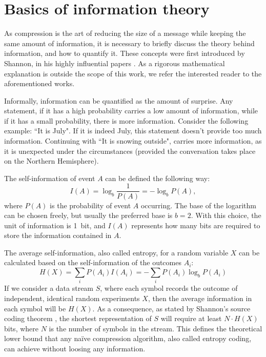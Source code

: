   
    \section{Basics of information theory}
      \label{sec:entropy}
      As compression is the art of reducing the size of a message while keeping the same amount of information, it is necessary to briefly discuss the theory behind information, and how to quantify it. These concepts were first introduced by Shannon, in his highly influential papers \cite{shannon_mathematical_1948,shannon_mathematical_1948-1,shannon_prediction_1951}. As a rigorous mathematical explanation is outside the scope of this work, we refer the interested reader to the aforementioned works.
  
      Informally, information can be quantified as the amount of surprise. Any statement, if it has a high probability carries a low amount of information, while if it has a small probability, there is more information. Consider the following example: ``It is July". If it is indeed July, this statement doesn't provide too much information. Continuing with ``It is snowing outside", carries more information, as it is unexpected under the circumstances (provided the conversation takes place on the Northern Hemisphere).
  
      The self-information of event $A$ can be defined the following way:
      \begin{equation}
        I(A) = \log_b \frac{1}{P(A)} = - \log_b P(A),
        \label{eq:selfInfo}
      \end{equation}
      where $P(A)$ is the probability of event $A$ occurring. The base of the logarithm can be chosen freely, but usually the preferred base is $b=2$. With this choice, the unit of information is \SI{1}{bit}, and $I(A)$ represents how many bits are required to store the information contained in $A$.
  
      The average self-information, also called entropy, for a random variable $X$ can be calculated based on the self-information of the outcomes $A_i$:
      \begin{equation}
        H(X) = \sum_i P(A_i)I(A_i) = - \sum_i P(A_i) \log_b P(A_i)
        \label{eq:entropy}
      \end{equation}
      If we consider a data stream $S$, where each symbol records the outcome of independent, identical random experiments $X$, then the average information in each symbol will be $H(X)$. As a consequence, as stated by Shannon's source coding theorem \cite{shannon_mathematical_1948}, the shortest representation of $S$ will require at least $N\cdot H(X)$ bits, where $N$ is the number of symbols in the stream. This defines the theoretical lower bound that any na\"ive compression algorithm, also called entropy coding, can achieve without loosing any information.
  

